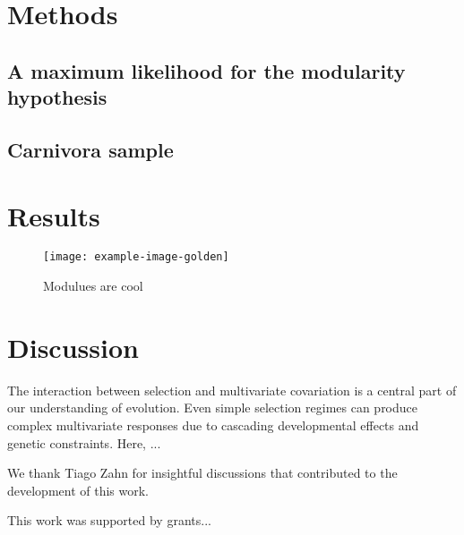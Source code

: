 \section*{Methods}


\subsection*{A maximum likelihood for the modularity hypothesis}

\subsection*{Carnivora sample}


\section*{Results}


\begin{figure}[h]
\texttt{[image: example-image-golden]}
\caption[Factors and modules]{ Modulues are cool }
\label{fig:example-fig}
\end{figure}



\section*{Discussion}

The interaction between selection and multivariate covariation is a
central part of our understanding of evolution. Even simple selection
regimes can produce complex multivariate responses due to cascading
developmental effects and genetic constraints. Here, ...


\begin{notes}[Acknowledgments]
We thank Tiago Zahn for insightful discussions that contributed to the
development of this work.
\end{notes}

\begin{notes}[Funding]
This work was supported by grants...
\end{notes}
